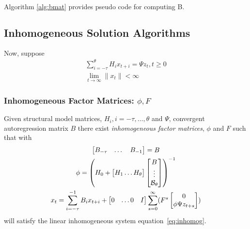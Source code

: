 \documentclass[12pt]{elsart}
\begin{document}
Algorithm \ref{alg:bmat} provides pseudo code for computing B.

\subsection{Inhomogeneous Solution Algorithms}

Now, suppose
\begin{gather}\label{eq:inhomog}
\sum_{i= - \tau}^\theta{ H_i  x_{ t + i } }= \Psi{} z_{t}, t \geq0\\
\lim_{ t \rightarrow\infty} \|x_t\|   < \infty
\end{gather}





\subsubsection{Inhomogeneous Factor Matrices: $\phi, F$}
\label{sec:inhomofactor}
\label{sec:inhomog}

\begin{thrm}\label{inHomo}
Given structural model matrices, $H_i, i=-\tau,\ldots,\theta$ and $\Psi$,
 convergent autoregression matrix $B$
there exist 
{\em inhomogeneous factor matrices}, $\phi$ and $F$ such that with 
\begin{gather}
\begin{bmatrix}
  B_{-\tau}&\dots&B_{-1}
\end{bmatrix}=B\\
 \phi= \left (  H_0 +   \begin{bmatrix}
    H_{1}\ldots H_\theta
  \end{bmatrix} \begin{bmatrix}
      B\\\vdots\\\ugB{\theta}
    \end{bmatrix} \right )^{-1} \\
 x_t=\sum_{i=-\tau}^{-1} B_i x_{t+i} + 
  \begin{bmatrix}
  0&\dots 0&I
  \end{bmatrix}
\sum_{s=0}^\infty%
 (F^{s} 
\begin{bmatrix}
0\\
\phi\Psi{}z_{t+s}  
\end{bmatrix}) 
\end{gather}
will satisfy 
the linear inhomogeneous system equation~\ref{eq:inhomog}.
\end{thrm}
\end{document}
